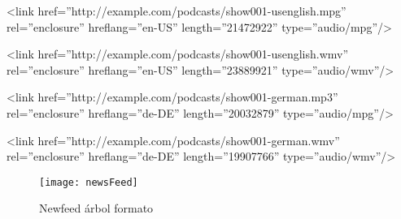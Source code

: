 <link href=”http://example.com/podcasts/show001-usenglish.mpg”
rel=”enclosure” hreflang=”en-US” length=”21472922” type=”audio/mpg”/>

<link href=”http://example.com/podcasts/show001-usenglish.wmv”
rel=”enclosure” hreflang=”en-US” length=”23889921” type=”audio/wmv”/>

<link href=”http://example.com/podcasts/show001-german.mp3”
rel=”enclosure” hreflang=”de-DE” length=”20032879” type=”audio/mpg”/>

<link href=”http://example.com/podcasts/show001-german.wmv”
rel=”enclosure” hreflang=”de-DE” length=”19907766” type=”audio/wmv”/>

\begin{figure}[!htb]
\centering
\texttt{[image: newsFeed]}
\caption{Newfeed árbol formato}
\end{figure}